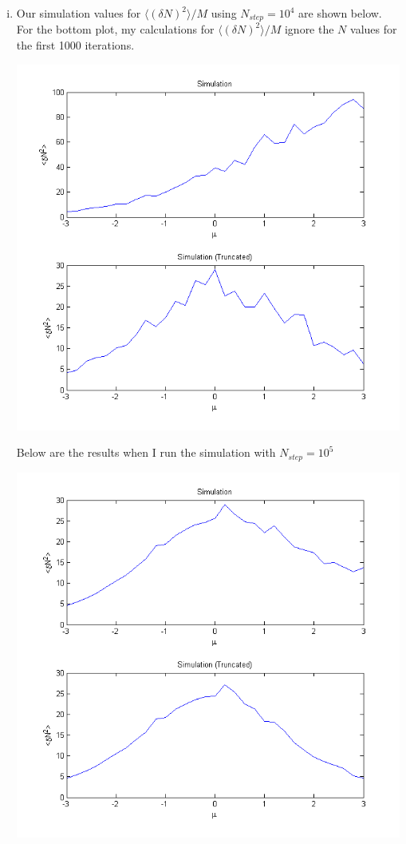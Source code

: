 \documentclass{article}
\begin{document}
\begin{enumerate}[i.]
  \item Our simulation values for $\langle (\delta N)^2 \rangle / M$ using $N_{step} = 10^4$ are shown below. For the bottom plot, my calculations for $\langle (\delta N)^2 \rangle / M$ ignore the $N$ values for the first 1000 iterations.
    \begin{center}
      \includegraphics[scale=0.5]{prob1iii_10000}
    \end{center}

    Below are the results when I run the simulation with $N_{step} = 10^5$

    \begin{center}
      \includegraphics[scale=0.5]{prob1iii_100000}
    \end{center}


\end{enumerate}
\end{document}
